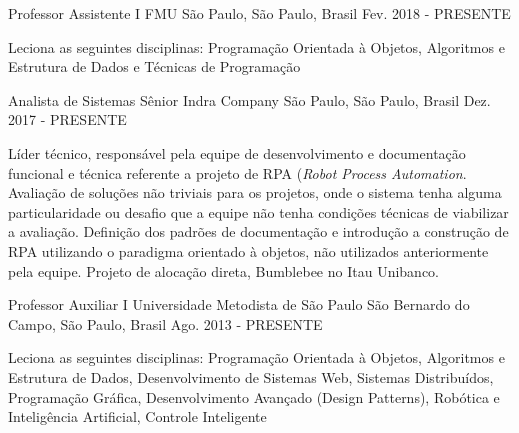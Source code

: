 

\begin{cventries}

  \cventry
    {Professor Assistente I} %
    {FMU} %
    {São Paulo, São Paulo, Brasil} %
    {Fev. 2018 - PRESENTE} %
    {
      \begin{cvitems} %
        \item {Leciona as seguintes disciplinas: Programação Orientada à Objetos, Algoritmos e Estrutura de Dados e Técnicas de Programação}
      \end{cvitems}
    }

  \cventry
    {Analista de Sistemas Sênior} %
    {Indra Company} %
    {São Paulo, São Paulo, Brasil} %
    {Dez. 2017 - PRESENTE} %
    {
      \begin{cvitems} %
        \item {Líder técnico, responsável pela equipe de desenvolvimento e documentação funcional e técnica referente a projeto de RPA (\emph{Robot Process Automation}. Avaliação de soluções não triviais para os projetos, onde o sistema tenha alguma particularidade ou desafio que a equipe não tenha condições técnicas de viabilizar a avaliação. Definição dos padrões de documentação e introdução a construção de RPA utilizando o paradigma orientado à objetos, não utilizados anteriormente pela equipe. Projeto de alocação direta, Bumblebee no Itau Unibanco.}
      \end{cvitems}
    }

  \cventry
    {Professor Auxiliar I} %
    {Universidade Metodista de São Paulo} %
    {São Bernardo do Campo, São Paulo, Brasil} %
    {Ago. 2013 - PRESENTE} %
    {
      \begin{cvitems} %
        \item {Leciona as seguintes disciplinas: Programação Orientada à Objetos, Algoritmos e Estrutura de Dados, Desenvolvimento de Sistemas Web, Sistemas Distribuídos, Programação Gráfica, Desenvolvimento Avançado (Design Patterns), Robótica e Inteligência Artificial, Controle Inteligente}
      \end{cvitems}
    }


\end{cventries}
